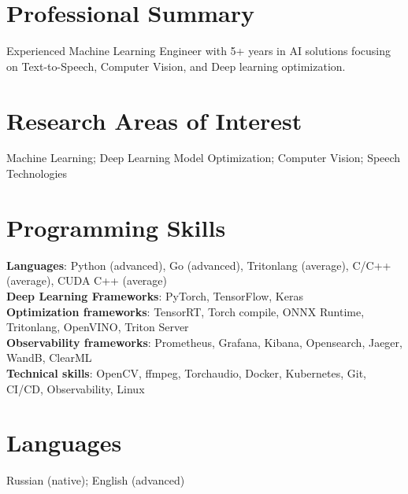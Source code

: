 \section{\sc Professional Summary}
Experienced Machine Learning Engineer with 5+ years in AI solutions focusing on Text-to-Speech, Computer Vision, and Deep learning optimization.

\section{\sc Research Areas of Interest}
{Machine Learning; Deep Learning Model Optimization; Computer Vision; Speech Technologies}

\section{\sc Programming Skills}
\textbf{Languages}: Python (advanced), Go (advanced), Tritonlang (average), C/C++ (average), CUDA C++ (average) \\
\textbf{Deep Learning Frameworks}: PyTorch, TensorFlow, Keras \\
\textbf{Optimization frameworks}: TensorRT, Torch compile, ONNX Runtime, Tritonlang, OpenVINO, Triton Server \\
\textbf{Observability frameworks}: Prometheus, Grafana, Kibana, Opensearch, Jaeger, WandB, ClearML \\
\textbf{Technical skills}: OpenCV, ffmpeg, Torchaudio, Docker, Kubernetes, Git, CI/CD, Observability, Linux

\section{\sc Languages}
{Russian (native); English (advanced)}

\endinput
